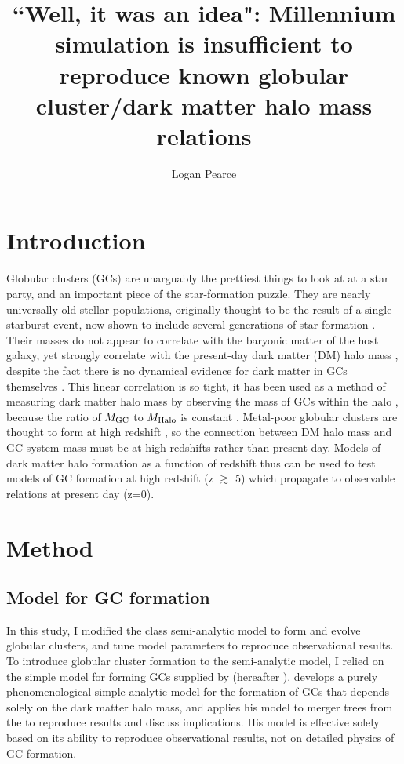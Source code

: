 \documentclass[onecolumn]{aastex62}
\begin{document}
\title{``Well, it was an idea": Millennium simulation is insufficient to reproduce known globular cluster/dark matter halo mass relations}


\author{Logan Pearce}




\section{Introduction} \label{sec:intro}
Globular clusters (GCs) are unarguably the prettiest things to look at at a star party, and an important piece of the star-formation puzzle.  They are nearly universally old stellar populations, originally thought to be the result of a single starburst event, now shown to include several generations of star formation \citep[e.g.][]{Gratton2012}.  Their masses do not appear to correlate with the baryonic matter of the host galaxy, yet strongly correlate with the present-day dark matter (DM) halo mass \citep{Spitler&Forbes2009,Forbes2016,Harris2017,Forbes2018}, despite the fact there is no dynamical evidence for dark matter in GCs themselves \citep{Conroy2011}.  This linear correlation is so tight, it has been used as a method of measuring dark matter halo mass by observing the mass of GCs within the halo \citep[e.g.][]{Spitler&Forbes2009,Forbes2016}, because the ratio of $M_{\rm{GC}}$ to $M_{\rm{Halo}}$ is constant \citep{Spitler&Forbes2009,Harris2017}.  Metal-poor globular clusters are thought to form at high redshift \citep{Brodie2006}, so the connection between DM halo mass and GC system mass must be at high redshifts rather than present day.  Models of dark matter halo formation as a function of redshift thus can be used to test models of GC formation at high redshift (z $\gtrsim$ 5) which propagate to observable relations at present day (z=0).



\section{Method} \label{sec:method}
\subsection{Model for GC formation}
In this study, I modified the class semi-analytic model to form and evolve globular clusters, and tune model parameters to reproduce observational results.  To introduce globular cluster formation to the semi-analytic model, I relied on the simple model for forming GCs supplied by \cite{MBK2017} (hereafter ).   develops a purely phenomenological simple analytic model for the formation of GCs that depends solely on the dark matter halo mass, and applies his model to merger trees from the \cite{Planck2016} to reproduce results and discuss implications.  His model is effective solely based on its ability to reproduce observational results, not on detailed physics of GC formation.
\end{document}
